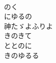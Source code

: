 \documentclass[10pt,b5j]{tarticle} %
\begin{document}
\begin{enumerate}
\begin{minipage}[c]{\blocksize}
        \vspace{\linespace}
        \item~\\
        のく\\
        にゆるの\\
        神たゞよふりよ\\
        きのきて\\
        ととのに\\
        きのゆるる
    
    \end{minipage}
\end{enumerate} %
\end{document}
